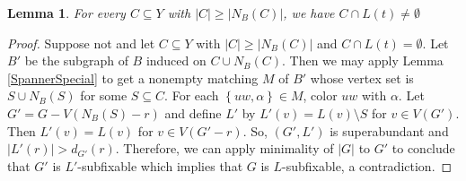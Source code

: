\documentclass[12pt]{article}
\theoremstyle{plain}
\newtheorem{lem}[thm]{Lemma}
\theoremstyle{definition}
\theoremstyle{remark}
\newcommand{\set}[1]{\left\{ #1 \right\}}
\newcommand{\card}[1]{\left|#1\right|}
\begin{document}
	\begin{lem}\label{TameEnoughColorsHits-t}
		For every $C \subseteq Y$ with $\card{C} \ge \card{N_B(C)}$, we have $C \cap L(t) \ne \emptyset$
	\end{lem}
	\begin{proof}
			Suppose not and let $C \subseteq Y$ with $\card{C} \ge \card{N_B(C)}$ and $C \cap L(t) = \emptyset$. Let $B'$ be the subgraph of $B$ induced on $C \cup N_B(C)$. Then we may apply Lemma \ref{SpannerSpecial} to get a nonempty matching $M$ of $B'$ whose vertex set is $S \cup N_B(S)$ for some $S \subseteq C$.  For each $\set{uw, \alpha} \in M$, color $uw$ with $\alpha$.   Let $G' = G - V(N_B(S) - r)$ and define $L'$ by $L'(v) = L(v) \setminus S$ for $v \in V(G')$.  Then $L'(v) = L(v)$ for $v \in V(G'-r)$. So, $(G', L')$ is superabundant and $|L'(r)| > d_{G'}(r)$.  Therefore, we can apply minimality of $|G|$ to $G'$ to conclude that $G'$ is $L'$-subfixable which implies that $G$ is $L$-subfixable, a contradiction.			
	\end{proof}
	
\end{document}
